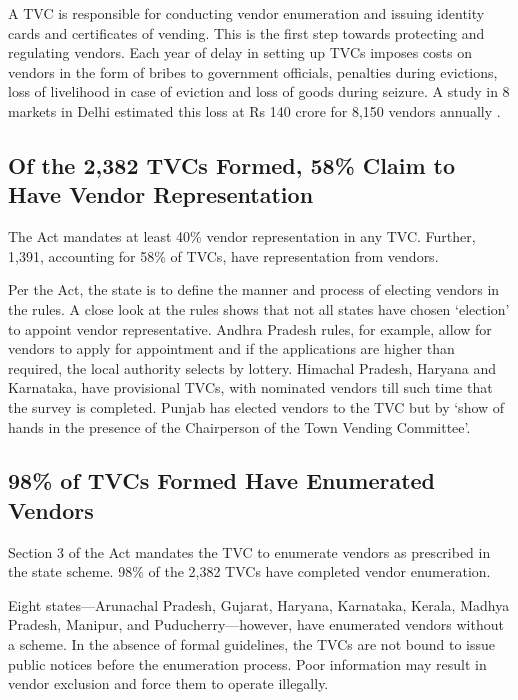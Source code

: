 \documentclass[a4paper, 12pt, twoside]{article}
\begin{document}
{	A TVC is responsible for conducting vendor enumeration and issuing identity cards and certificates of vending. This is the first step towards protecting and regulating vendors. Each year of delay in setting up TVCs imposes costs on vendors in the form of bribes to government officials, penalties during evictions, loss of livelihood in case of eviction and loss of goods during seizure. A study in 8 markets in Delhi estimated this loss at Rs 140 crore for 8,150 vendors annually \parencite{ratanpaper}.

\subsection*{Of the 2,382 TVCs Formed, 58\% Claim to Have Vendor Representation}
	
	The Act mandates at least 40\% vendor representation in any TVC. Further, 1,391, accounting for 58\% of TVCs, have representation from vendors.

	Per the Act, the state is to define the manner and process of electing vendors in the rules. A close look at the rules shows that not all states have chosen `election' to appoint vendor representative. Andhra Pradesh rules, for example, allow for vendors to apply for appointment and if the applications are higher than required, the local authority selects by lottery. Himachal Pradesh, Haryana and Karnataka, have provisional TVCs, with nominated vendors till such time that the survey is completed. Punjab has elected vendors to the TVC but by `show of hands in the presence of the Chairperson of the Town Vending Committee'.
	
\subsection*{98\% of TVCs Formed Have Enumerated Vendors}
	
	Section 3 of the Act mandates the TVC to enumerate vendors as prescribed in the state scheme. 98\% of the 2,382 TVCs have completed vendor enumeration.

	Eight states—Arunachal Pradesh, Gujarat, Haryana, Karnataka, Kerala, Madhya Pradesh, Manipur, and Puducherry—however, have enumerated vendors without a scheme. In the absence of formal guidelines, the TVCs are not bound to issue public notices before the enumeration process. Poor information may result in vendor exclusion and force them to operate illegally.

}
\end{document}
